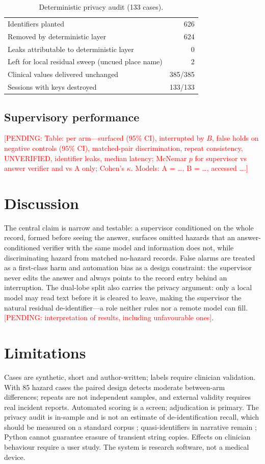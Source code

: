 \documentclass[journal]{IEEEtran}
\newcommand{\pending}[1]{\textcolor{red}{[PENDING: #1]}}
\begin{document}
\begin{table}[!t]
\caption{Deterministic privacy audit (133 cases).}
\label{tab:privacy}
\centering\footnotesize
\begin{tabular}{@{}lr@{}}
\toprule
Identifiers planted & 626\\
Removed by deterministic layer & 624\\
Leaks attributable to deterministic layer & 0\\
Left for local residual sweep (uncued place name) & 2\\
Clinical values delivered unchanged & 385/385\\
Sessions with keys destroyed & 133/133\\\bottomrule
\end{tabular}
\end{table}

\subsection{Supervisory performance}
\pending{Table: per arm---surfaced (95\% CI), interrupted by $B$, false holds on negative controls (95\% CI), matched-pair discrimination, repeat consistency, UNVERIFIED, identifier leaks, median latency; McNemar $p$ for supervisor vs answer verifier and vs A only; Cohen's $\kappa$. Models: A = \dots, B = \dots, accessed \dots.}

\section{Discussion}
The central claim is narrow and testable: a supervisor conditioned on the whole record, formed before seeing the answer, surfaces omitted hazards that an answer-conditioned verifier with the same model and information does not, while discriminating hazard from matched no-hazard records. False alarms are treated as a first-class harm and automation bias as a design constraint: the supervisor never edits the answer and always points to the record entry behind an interruption. The dual-lobe split also carries the privacy argument: only a local model may read text before it is cleared to leave, making the supervisor the natural residual de-identifier---a role neither rules \cite{stubbs2015,neamatullah2008} nor a remote model can fill. \pending{interpretation of results, including unfavourable ones}.

\section{Limitations}
Cases are synthetic, short and author-written; labels require clinician validation. With 85 hazard cases the paired design detects moderate between-arm differences; repeats are not independent samples, and external validity requires real incident reports. Automated scoring is a screen; adjudication is primary. The privacy audit is in-sample and is not an estimate of de-identification recall, which should be measured on a standard corpus \cite{stubbs2015}; quasi-identifiers in narrative remain \cite{sweeney2000}; Python cannot guarantee erasure of transient string copies. Effects on clinician behaviour require a user study. The system is research software, not a medical device.
\end{document}
